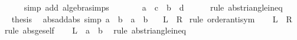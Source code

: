 \begin{isabellebody}
\ \ \ \ \isamarkupfalse%
\ {\isacharparenleft}{\kern0pt}simp\ add{\isacharcolon}{\kern0pt}\ algebra{\isacharunderscore}{\kern0pt}simps{\isacharparenright}{\kern0pt}\isanewline
\ \ \isamarkupfalse%
\ \isamarkupfalse%
\ {\isachardoublequoteopen}{\isasymdots}\ {\isasymle}\ {\isasymbar}a\ {\isacharminus}{\kern0pt}\ c{\isasymbar}\ {\isacharplus}{\kern0pt}\ {\isasymbar}b\ {\isacharminus}{\kern0pt}\ d{\isasymbar}{\isachardoublequoteclose}\isanewline
\ \ \ \ \isamarkupfalse%
\ {\isacharparenleft}{\kern0pt}rule\ abs{\isacharunderscore}{\kern0pt}triangle{\isacharunderscore}{\kern0pt}ineq{\isacharparenright}{\kern0pt}\isanewline
\ \ \isamarkupfalse%
\ \isamarkupfalse%
\ {\isacharquery}{\kern0pt}thesis\ \isacommand{{\isachardot}{\kern0pt}}\isamarkupfalse%
\isanewline
{}\isamarkupfalse%
%
\endisatagproof
{\isafoldproof}%
%
\isadelimproof
\isanewline
%
\endisadelimproof
\isanewline
{}\isamarkupfalse%
\ abs{\isacharunderscore}{\kern0pt}add{\isacharunderscore}{\kern0pt}abs\ {\isacharbrackleft}{\kern0pt}simp{\isacharbrackright}{\kern0pt}{\isacharcolon}{\kern0pt}\ {\isachardoublequoteopen}{\isasymbar}{\isasymbar}a{\isasymbar}\ {\isacharplus}{\kern0pt}\ {\isasymbar}b{\isasymbar}{\isasymbar}\ {\isacharequal}{\kern0pt}\ {\isasymbar}a{\isasymbar}\ {\isacharplus}{\kern0pt}\ {\isasymbar}b{\isasymbar}{\isachardoublequoteclose}\isanewline
\ \ {\isacharparenleft}{\kern0pt}\ {\isachardoublequoteopen}{\isacharquery}{\kern0pt}L\ {\isacharequal}{\kern0pt}\ {\isacharquery}{\kern0pt}R{\isachardoublequoteclose}{\isacharparenright}{\kern0pt}\isanewline
%
\isadelimproof
%
\endisadelimproof
%
\isatagproof
{}\isamarkupfalse%
\ {\isacharparenleft}{\kern0pt}rule\ order{\isachardot}{\kern0pt}antisym{\isacharparenright}{\kern0pt}\isanewline
\ \ \isamarkupfalse%
\ {\isachardoublequoteopen}{\isacharquery}{\kern0pt}L\ {\isasymge}\ {\isacharquery}{\kern0pt}R{\isachardoublequoteclose}\ \isamarkupfalse%
\ {\isacharparenleft}{\kern0pt}rule\ abs{\isacharunderscore}{\kern0pt}ge{\isacharunderscore}{\kern0pt}self{\isacharparenright}{\kern0pt}\isanewline
\ \ \isamarkupfalse%
\ {\isachardoublequoteopen}{\isacharquery}{\kern0pt}L\ {\isasymle}\ {\isasymbar}{\isasymbar}a{\isasymbar}{\isasymbar}\ {\isacharplus}{\kern0pt}\ {\isasymbar}{\isasymbar}b{\isasymbar}{\isasymbar}{\isachardoublequoteclose}\ \isamarkupfalse%
\ {\isacharparenleft}{\kern0pt}rule\ abs{\isacharunderscore}{\kern0pt}triangle{\isacharunderscore}{\kern0pt}ineq{\isacharparenright}{\kern0pt}\isanewline

\end{isabellebody}
